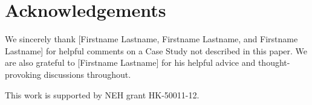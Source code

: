 \documentclass{sig-alternate}
\begin{document}
\section{Acknowledgements}
We sincerely thank [Firstname Lastname, Firstname Lastname, and Firstname Lastname] for helpful comments on a Case Study not described in this paper. We are also grateful to [Firstname Lastname] for his helpful advice and thought-provoking discussions throughout.

This work is supported by NEH grant HK-50011-12.


 
  
\end{document}
